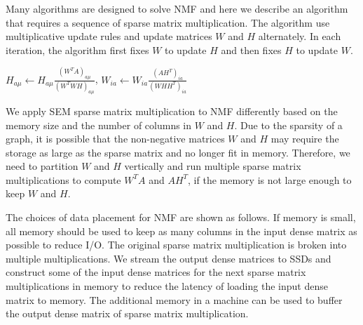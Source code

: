 Many algorithms are designed to solve NMF and here we describe an algorithm
\cite{nmf} that requires a sequence of sparse matrix multiplication.
The algorithm use multiplicative update rules and update matrices $W$ and $H$
alternately. In each iteration, the algorithm first fixes $W$ to update $H$
and then fixes $H$ to update $W$.

$H_{a\mu} \leftarrow H_{a\mu} \frac{{(W^TA)}_{a\mu}}{{(W^TWH)}_{a\mu}}$,
$W_{ia} \leftarrow W_{ia} \frac{{(AH^T)}_{ia}}{{(WHH^T)}_{ia}}$

We apply SEM sparse matrix multiplication to NMF differently
based on the memory size and the number of columns in $W$ and $H$. Due to
the sparsity of a graph, it is possible that the non-negative matrices $W$ and
$H$ may require the storage as large as the sparse matrix and no longer fit in
memory. Therefore, we need to partition $W$ and $H$ vertically and run multiple
sparse matrix multiplications to compute $W^TA$ and $AH^T$, if the memory is not
large enough to keep $W$ and $H$.

The choices of data placement for NMF are
shown as follows. If memory is small, all memory should be used to keep as many
columns in the input dense matrix as possible to reduce I/O. The original sparse
matrix multiplication is broken into multiple multiplications. We stream the output
dense matrices to SSDs and construct some of the input dense matrices for the next
sparse matrix multiplications in memory to reduce the latency of loading
the input dense matrix to memory. The additional memory in a machine can be used
to buffer the output dense matrix of sparse matrix multiplication.
